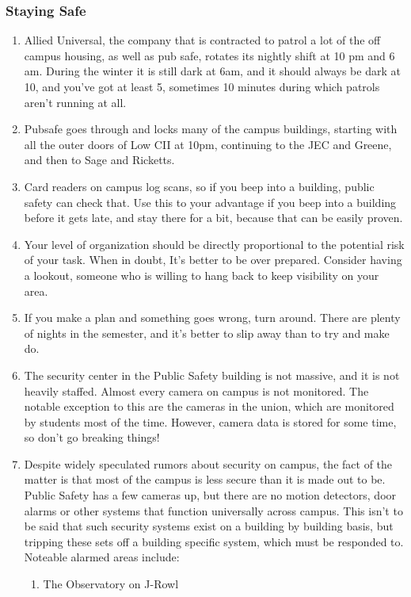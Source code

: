 \documentclass{article}
\begin{document}
\subsubsection{Staying Safe}
\begin{enumerate}
\item Allied Universal, the company that is contracted to patrol a lot of the off campus housing, as well as pub safe, rotates its nightly shift at 10 pm and 6 am. During the winter it is still dark at 6am, and it should always be dark at 10, and you’ve got at least 5, sometimes 10 minutes during which patrols aren’t running at all.
\item Pubsafe goes through and locks many of the campus buildings, starting with all the outer doors of Low CII at 10pm, continuing to the JEC and Greene, and then to Sage and Ricketts.
\item Card readers on campus log scans, so if you beep into a building, public safety can check that. Use this to your advantage if you beep into a building before it gets late, and stay there for a bit, because that can be easily proven.
\item Your level of organization should be directly proportional to the potential risk of your task. When in doubt, It’s better to be over prepared. Consider having a lookout, someone who is willing to hang back to keep visibility on your area.
\item If you make a plan and something goes wrong, turn around. There are plenty of nights in the semester, and it’s better to slip away than to try and make do.
\item The security center in the Public Safety building is not massive, and it is not heavily staffed. Almost every camera on campus is not monitored. The notable exception to this are the cameras in the union, which are monitored by students most of the time. However, camera data is stored for some time, so don’t go breaking things!
\item Despite widely speculated rumors about security on campus, the fact of the matter is that most of the campus is less secure than it is made out to be. Public Safety has a few cameras up, but there are no motion detectors, door alarms or other systems that function universally across campus. This isn’t to be said that such security systems exist on a building by building basis, but tripping these sets off a building specific system, which must be responded to. Noteable alarmed areas include:
  \begin{enumerate}
    \item The Observatory on J-Rowl 

\end{enumerate}
\end{enumerate}
\end{document}
